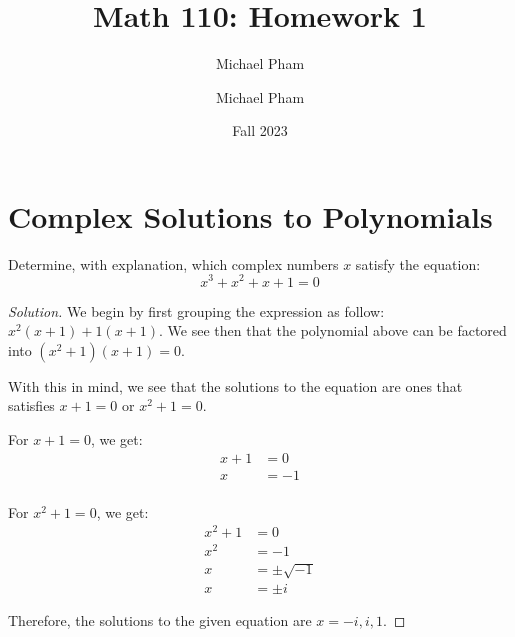 \documentclass{article}
\title{#1}
\author{Michael Pham}
\date{#2}
\newenvironment{solution}{\begin{proof}[Solution]}{\end{proof}}
\newcommand{\mytitle}[2]{%
	\title{#1}
	\author{Michael Pham}
	\date{#2}
	\maketitle
	\newpage
	\tableofcontents
	\newpage
}
\begin{document}
\mytitle{Math 110: Homework 1}{Fall 2023}

\section{Complex Solutions to Polynomials}
\begin{hw}
	Determine, with explanation, which complex numbers $x$ satisfy the equation:
	\begin{equation*}
		x^{3} + x^{2} + x + 1 = 0
	\end{equation*}
\end{hw}
\begin{solution}
	We begin by first grouping the expression as follow: $x^{2}(x+1) + 1(x+1)$. We see then that the polynomial above can be factored into $(x^{2}+1)(x+1) = 0$.
	
	With this in mind, we see that the solutions to the equation are ones that satisfies $x+1 = 0$ or $x^{2} + 1 = 0$.
	
	For $x+1=0$, we get:
	\begin{align*}
		x + 1 &= 0 \\
		x &= -1 \\
	\end{align*}

	For $x^{2} + 1 = 0$, we get:
	\begin{align*}
		x^{2} + 1 &= 0 \\
		x^{2} &= -1 \\
		x &= \pm\sqrt{-1} \\
		x &= \pm i
	\end{align*}

	Therefore, the solutions to the given equation are $x = -i, i, 1$.
\end{solution}

\newpage
\end{document}
